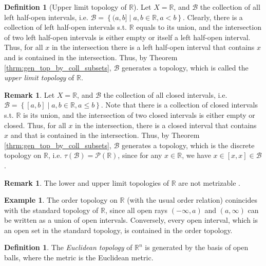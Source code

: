 \documentclass[12pt, a4paper]{article}
\numberwithin{equation}{section}
\theoremstyle{definition}
\theoremstyle{definition}
\newtheorem{defn}[thm]{Definition} %
\newtheorem{exmp}[thm]{Example} %
\newtheorem{remark}[thm]{Remark} %
\begin{document}
		\begin{defn}[Upper limit topology of $\mathbb R$]
			Let $X = \mathbb R$, and $\mathscr B$ the collection of all left half-open intervals, i.e. $\mathscr B= \left\{ (a, b] \mid a, b\in\mathbb R, a < b \right\}$. Clearly, there is a collection of left half-open intervals s.t. $\mathbb R$ equals to its union, and the intersection of two left half-open intervals is either empty or itself a left half-open interval. Thus, for all $x$ in the intersection there is a left half-open interval that contains $x$ and is contained in the intersection. Thus, by Theorem \ref{thrm:gen_top_by_coll_subsets}, $\mathscr B$ generates a topology, which is called the \textit{upper limit topology} of $\mathbb R$.
		\end{defn}
	
		\begin{remark}
			Let $X = \mathbb R$, and $\mathscr B$ the collection of all closed intervals, i.e. $\mathscr B = \left\{ [a, b]\mid a, b\in\mathbb R, a \leq b \right\}$. Note that there is a collection of closed intervals s.t. $\mathbb R$ is its union, and the intersection of two closed intervals is either empty or closed. Thus, for all $x$ in the intersection, there is a closed interval that contains $x$ and that is contained in the intersection. Thus, by Theorem \ref{thrm:gen_top_by_coll_subsets}, $\mathscr B$ generates a topology, which is the discrete topology on $\mathbb R$, i.e. $\tau(\mathscr B) = \mathscr P(\mathbb R)$, since for any $x\in \mathbb R$, we have $x\in [x, x]\in \mathscr B$.
		\end{remark}
	
		\begin{remark}
			The lower and upper limit topologies of $\mathbb R$ are not metrizable \cite{790629}.
		\end{remark}

		\begin{exmp}
			The order topology on $\mathbb R$ (with the usual order relation) conincides with the standard topology of $\mathbb R$, since all open rays $(-\infty, a)$ and $(a, \infty)$ can be written as a union of open intervals. Conversely, every open interval, which is an open set in the standard topology, is contained in the order topology.
		\end{exmp}
		
		\begin{defn}\label{defn:euclidean_topology}
			The \textit{Euclidean topology} of $\mathbb R^n$ is generated by the basis of open balls, where the metric is the Euclidean metric.
		\end{defn}	
\end{document}
